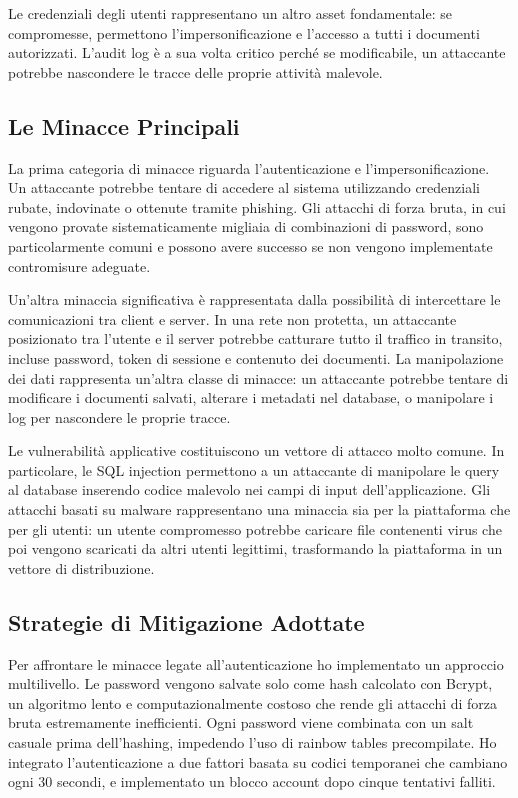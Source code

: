 \documentclass[12pt, a4paper]{article}
\begin{document}
Le credenziali degli utenti rappresentano un altro asset fondamentale: se compromesse, permettono l'impersonificazione e l'accesso a tutti i documenti autorizzati. L'audit log è a sua volta critico perché se modificabile, un attaccante potrebbe nascondere le tracce delle proprie attività malevole.

\subsection{Le Minacce Principali}

La prima categoria di minacce riguarda l'autenticazione e l'impersonificazione. Un attaccante potrebbe tentare di accedere al sistema utilizzando credenziali rubate, indovinate o ottenute tramite phishing. Gli attacchi di forza bruta, in cui vengono provate sistematicamente migliaia di combinazioni di password, sono particolarmente comuni e possono avere successo se non vengono implementate contromisure adeguate.

Un'altra minaccia significativa è rappresentata dalla possibilità di intercettare le comunicazioni tra client e server. In una rete non protetta, un attaccante posizionato tra l'utente e il server potrebbe catturare tutto il traffico in transito, incluse password, token di sessione e contenuto dei documenti. La manipolazione dei dati rappresenta un'altra classe di minacce: un attaccante potrebbe tentare di modificare i documenti salvati, alterare i metadati nel database, o manipolare i log per nascondere le proprie tracce.

Le vulnerabilità applicative costituiscono un vettore di attacco molto comune. In particolare, le SQL injection permettono a un attaccante di manipolare le query al database inserendo codice malevolo nei campi di input dell'applicazione. Gli attacchi basati su malware rappresentano una minaccia sia per la piattaforma che per gli utenti: un utente compromesso potrebbe caricare file contenenti virus che poi vengono scaricati da altri utenti legittimi, trasformando la piattaforma in un vettore di distribuzione.

\subsection{Strategie di Mitigazione Adottate}

Per affrontare le minacce legate all'autenticazione ho implementato un approccio multilivello. Le password vengono salvate solo come hash calcolato con Bcrypt, un algoritmo lento e computazionalmente costoso che rende gli attacchi di forza bruta estremamente inefficienti. Ogni password viene combinata con un salt casuale prima dell'hashing, impedendo l'uso di rainbow tables precompilate. Ho integrato l'autenticazione a due fattori basata su codici temporanei che cambiano ogni 30 secondi, e implementato un blocco account dopo cinque tentativi falliti.
\end{document}
